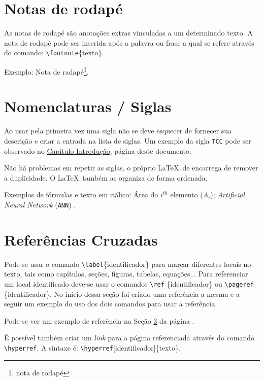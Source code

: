 \section{Notas de rodapé}

As notas de rodapé são anotações extras vinculadas a um determinado texto. A nota de rodapé pode ser inserida após a palavra ou frase a qual se refere através do comando: \verb'\footnote'\{texto\}.  

Exemplo: Nota de radapé\footnote{nota de rodapé}.


\section{Nomenclaturas / Siglas}

Ao usar pela primeira vez uma sigla não se deve esquecer de fornecer sua descrição e criar a entrada na lista de siglas. Um exemplo da sigla \verb'TCC' pode ser observado no 
\hyperref[exemplo:nomenclatura]{Capítulo Introdução},  página \pageref{exemplo:nomenclatura} deste documento.

Não há problemas em repetir as siglas, o próprio \LaTeX\ de encarrega de remover a duplicidade. O \LaTeX\ também as organiza de forma ordenada.

Exemplos de fórmulas e texto em itálico: Área do $i^{th}$ elemento ($A_i$); \textit{Artificial Neural Network} (\verb'ANN') .


\section{Referências Cruzadas}
\label{sec:exemplo}

Pode-se usar o comando \verb'\label'\{identificador\} para  marcar diferentes locais no texto, tais como capítulos, seções, figuras, tabelas, equações... Para referenciar um local identificado deve-se usar o comandos \verb'\ref' \{identificador\} ou \verb'\pageref' \{identificador\}. No inicio dessa seção foi criado uma referência a mesma e a seguir um exemplo do uso dos dois comandos para usar a referência.

Pode-se ver um exemplo de referência na Seção \ref{sec:exemplo} da página \pageref{sec:exemplo}.

É possível também criar um \textit{link} para a página referenciada através do comando 
\verb'\hyperref'. A sintaxe é: \verb'\hyperref'[identificador]\{texto\}. 

